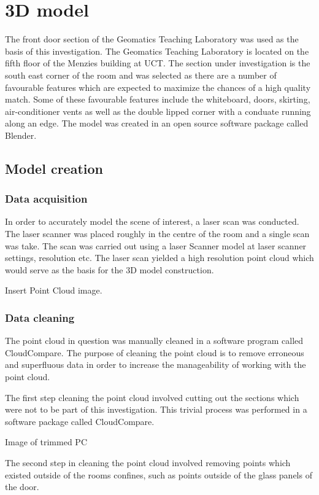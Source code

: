 \documentclass[11pt,a4paper]{report}
\begin{document}
	\section{3D model}
		The front door section of the Geomatics Teaching Laboratory was used as the basis of this investigation. The Geomatics Teaching Laboratory is located on the fifth floor of the Menzies building at UCT. The section under investigation is the south east corner of the room and was selected as there are a number of favourable features which are expected to maximize the chances of a high quality match. Some of these favourable features include the whiteboard, doors, skirting, air-conditioner vents as well as the double lipped corner with a conduate running along an edge. The model was created in an open source software package called Blender.
		\subsection{Model creation}
			\subsubsection{Data acquisition}
				In order to accurately model the scene of interest, a laser scan was conducted. The laser scanner was placed roughly in the centre of the room and a single scan was take. The scan was carried out using a {{laser Scanner model}} at {{laser scanner settings, resolution etc}}. The laser scan yielded a high resolution point cloud which would serve as the basis for the 3D model construction.
				
				{{Insert Point Cloud image}}.
				
			\subsubsection{Data cleaning}
				The point cloud in question was manually cleaned in a software program called CloudCompare. The purpose of cleaning the point cloud is to remove erroneous and superfluous data in order to increase the manageability of working with the point cloud.
	
				The first step cleaning the point cloud involved cutting out the sections which were not to be part of this investigation. This trivial process was performed in a software package called CloudCompare.
				
				{{Image of trimmed PC}}
				
				The second step in cleaning the point cloud involved removing points which existed outside of the rooms confines, such as points outside of the glass panels of the door.
				
\end{document}
